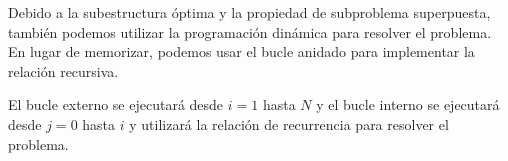 Debido a la subestructura óptima y la propiedad de subproblema superpuesta, también podemos utilizar la programación dinámica para resolver el problema. En lugar de memorizar, podemos usar el bucle anidado para implementar la relación recursiva.

El bucle externo se ejecutará desde $i = 1$ hasta $N$ y el bucle interno se ejecutará desde $j = 0$ hasta $i$ y utilizará la relación de recurrencia para resolver el problema.